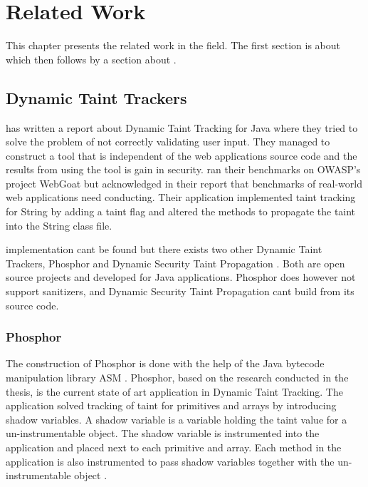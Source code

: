 \chapter{Related Work}
This chapter presents the related work in the field. The first section is about \textit{} which then follows by a section about \textit{}.



\section{Dynamic Taint Trackers}
\label{RW:DynamicTaintTracking}
\textcite{Haldar} has written a report about Dynamic Taint Tracking for Java where they tried to solve the problem of not correctly validating user input. They managed to construct a tool that is independent of the web applications source code and the results from using the tool is gain in security. \textcite{Haldar} ran their benchmarks on OWASP’s project WebGoat \parencite{webgoat} but acknowledged in their report that benchmarks of real-world web applications need conducting. Their application implemented taint tracking for String by adding a taint flag and altered the methods to propagate the taint into the String class file.

\textcite{Haldar} implementation cant be found but there exists two other Dynamic Taint Trackers, Phosphor \parencite{phosphor} and Dynamic Security Taint Propagation \parencite{securityTaint}. Both are open source projects and developed for Java applications. Phosphor does however not support sanitizers, and Dynamic Security Taint Propagation cant build from its source code.



\subsection{Phosphor}
The construction of Phosphor \parencite{phosphor} is done with the help of the Java bytecode manipulation library ASM \parencite{asm}. Phosphor, based on the research conducted in the thesis, is the current state of art application in Dynamic Taint Tracking. The application solved tracking of taint for primitives and arrays by introducing shadow variables. A shadow variable is a variable holding the taint value for a un-instrumentable object. The shadow variable is instrumented into the application and placed next to each primitive and array. Each method in the application is also instrumented to pass shadow variables together with the un-instrumentable object \parencite{BellJ.2014PIdd}.



